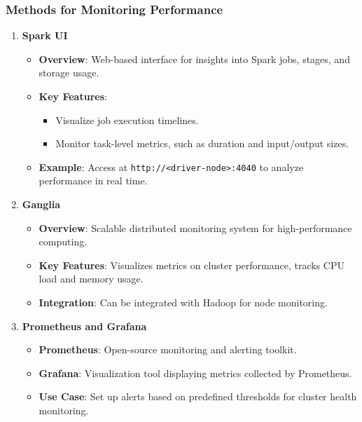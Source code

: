 \documentclass{beamer}
\begin{document}
\begin{frame}[fragile]
    \frametitle{Methods for Monitoring Performance}
    \begin{enumerate}
        \item \textbf{Spark UI}
            \begin{itemize}
                \item \textbf{Overview}: Web-based interface for insights into Spark jobs, stages, and storage usage.
                \item \textbf{Key Features}:
                    \begin{itemize}
                        \item Visualize job execution timelines.
                        \item Monitor task-level metrics, such as duration and input/output sizes.
                    \end{itemize}
                \item \textbf{Example}: Access at \texttt{http://<driver-node>:4040} to analyze performance in real time.
            \end{itemize}

        \item \textbf{Ganglia}
            \begin{itemize}
                \item \textbf{Overview}: Scalable distributed monitoring system for high-performance computing.
                \item \textbf{Key Features}: Visualizes metrics on cluster performance, tracks CPU load and memory usage.
                \item \textbf{Integration}: Can be integrated with Hadoop for node monitoring.
            \end{itemize}

        \item \textbf{Prometheus and Grafana}
            \begin{itemize}
                \item \textbf{Prometheus}: Open-source monitoring and alerting toolkit.
                \item \textbf{Grafana}: Visualization tool displaying metrics collected by Prometheus.
                \item \textbf{Use Case}: Set up alerts based on predefined thresholds for cluster health monitoring.
            \end{itemize}
    \end{enumerate}
\end{frame}
\end{document}
